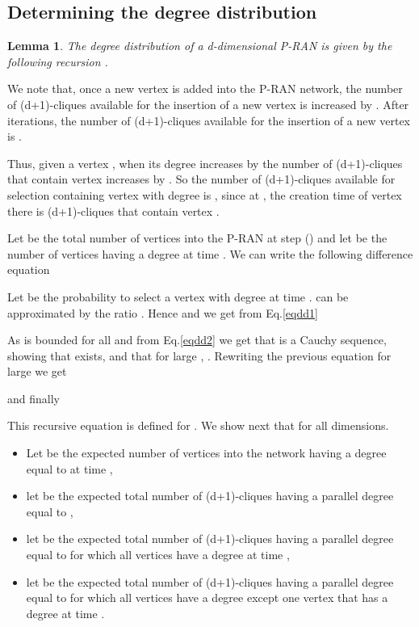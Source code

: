 \documentclass[11pt]{iopart}
\newtheorem{lemma}[theorem]{Lemma}
\newenvironment{proof}[1][Proof]{\begin{trivlist}
    \item[\hskip \labelsep {\bfseries #1}]}{\end{trivlist}}
\begin{document}
\subsection{Determining the degree distribution}

\begin{lemma}
The degree distribution of a d-dimensional P-RAN is given by the following recursion
.
\end{lemma}


\begin{proof}
We note that, once a new vertex is added into the P-RAN network, the number of (d+1)-cliques available for the insertion of a new vertex is increased by . After  iterations, the number of (d+1)-cliques  available for the insertion of a new vertex is . 

Thus, given a vertex , when its degree increases by  the number of (d+1)-cliques that contain vertex  increases by . So the number of (d+1)-cliques available for selection containing vertex   with degree  is , since at , the creation time of vertex  there is  (d+1)-cliques that contain vertex . 


Let  be the total number of vertices into the P-RAN at step  () and let  be the number of vertices having a degree  at time . We can write the following difference equation

 
 
Let  be the probability to select a vertex with  degree  at time .  can be approximated by the ratio . Hence  and we get from Eq.\ref{eqdd1}

 

As  is bounded for all  and  from Eq.\ref{eqdd2} we get that  is a Cauchy sequence, showing that  exists, and that for large , . Rewriting the previous equation for large  we get

 


and finally 



This recursive equation is defined for . We show next that  for all dimensions.
 
\begin{itemize}
 \item Let  be the expected number of vertices into the network having a degree equal to  at time , 
 \item let  be the expected total number of (d+1)-cliques having a parallel degree equal to , 
 \item let  be the expected total number of (d+1)-cliques having a parallel degree equal to  for which all vertices have a degree  at time ,
 \item let  be the expected total number of (d+1)-cliques having a parallel degree equal to  for which all vertices have a degree  except one vertex that has a degree  at time .
\end{itemize}


\end{proof}
\end{document}

